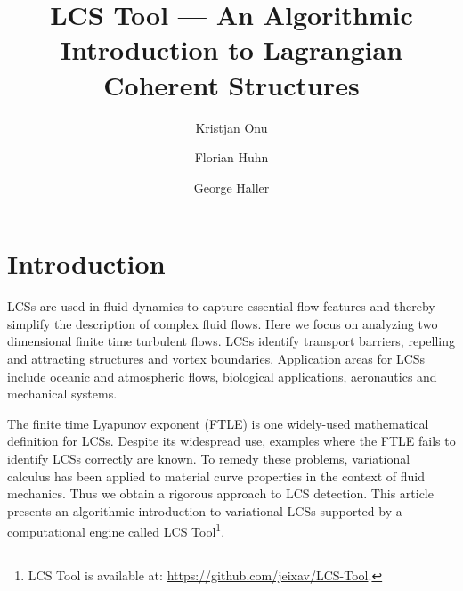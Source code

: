 \documentclass{article}
\title{LCS Tool — An Algorithmic Introduction to Lagrangian Coherent 
Structures}
\author{Kristjan Onu \and Florian Huhn \and George Haller}
\begin{document}

\maketitle

\tableofcontents


\section{Introduction}

LCSs are used in fluid dynamics to capture essential flow features and thereby simplify the description of complex fluid flows. Here we focus on analyzing two dimensional finite time turbulent flows. LCSs identify transport barriers, repelling and attracting structures and vortex boundaries. Application areas for LCSs include oceanic and atmospheric flows, biological applications\parencite{wilson09:_lagran_reynol,tallapragada11:_lagran}, aeronautics\parencite{tang10:_accur_lagran_hong_kong_inter_airpor} and mechanical systems\parencite{hadjighasem13:_detec_kam}.

The finite time Lyapunov exponent (FTLE) is one widely-used mathematical definition for LCSs. Despite its widespread use, examples where the FTLE fails to identify LCSs correctly are known\parencite{haller11:_lagran_coher_struc,norgard12:_secon_lagran_coher_struc}. To remedy these problems, variational calculus has been applied to material curve properties in the context of fluid mechanics. Thus we obtain a rigorous approach to LCS detection\parencite{haller11:_lagran_coher_struc,farazmand12:_comput_lagran,haller12:_geodes_theor_trans_barrier_two_dimen_flows,farazmand13:_attrac_lagran,haller13:_coher_lagran}. This article presents an algorithmic introduction to variational LCSs supported by a computational engine called LCS Tool\footnote{LCS Tool is available at: \url{https://github.com/jeixav/LCS-Tool}.}.
\end{document}
